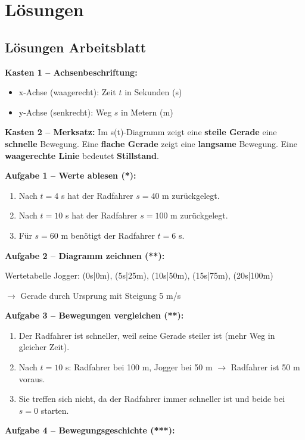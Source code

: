 \documentclass[11pt,a4paper]{article}
\begin{document}
\section{Lösungen}

\subsection{Lösungen Arbeitsblatt}

\textbf{Kasten 1 -- Achsenbeschriftung:}
\begin{itemize}
    \item x-Achse (waagerecht): Zeit $t$ in Sekunden (s)
    \item y-Achse (senkrecht): Weg $s$ in Metern (m)
\end{itemize}

\textbf{Kasten 2 -- Merksatz:}
Im s(t)-Diagramm zeigt eine \textbf{steile Gerade} eine \textbf{schnelle} Bewegung. Eine \textbf{flache Gerade} zeigt eine \textbf{langsame} Bewegung. Eine \textbf{waagerechte Linie} bedeutet \textbf{Stillstand}.

\textbf{Aufgabe 1 -- Werte ablesen (*):}
\begin{enumerate}[label=\alph*)]
    \item Nach $t = 4$ s hat der Radfahrer $s = 40$ m zurückgelegt.
    \item Nach $t = 10$ s hat der Radfahrer $s = 100$ m zurückgelegt.
    \item Für $s = 60$ m benötigt der Radfahrer $t = 6$ s.
\end{enumerate}

\textbf{Aufgabe 2 -- Diagramm zeichnen (**):}

Wertetabelle Jogger: (0s|0m), (5s|25m), (10s|50m), (15s|75m), (20s|100m)

$\to$ Gerade durch Ursprung mit Steigung 5 m/s

\textbf{Aufgabe 3 -- Bewegungen vergleichen (**):}
\begin{enumerate}[label=\alph*)]
    \item Der Radfahrer ist schneller, weil seine Gerade steiler ist (mehr Weg in gleicher Zeit).
    \item Nach $t = 10$ s: Radfahrer bei 100 m, Jogger bei 50 m $\to$ Radfahrer ist 50 m voraus.
    \item Sie treffen sich nicht, da der Radfahrer immer schneller ist und beide bei $s = 0$ starten.
\end{enumerate}

\textbf{Aufgabe 4 -- Bewegungsgeschichte (***):}
\end{document}
